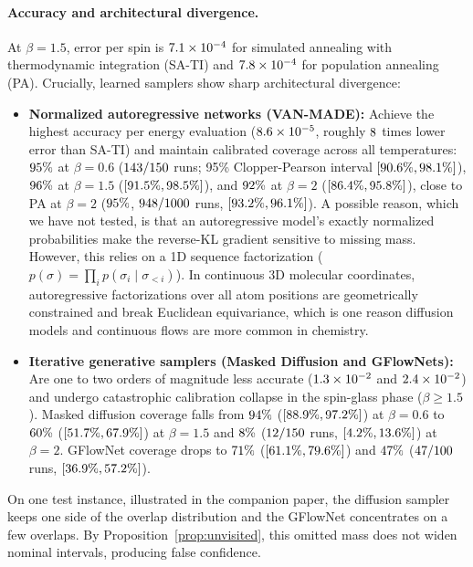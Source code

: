 \paragraph{Accuracy and architectural divergence.} At $\beta=1.5$, error per spin is $7.1\times10^{-4}$ for simulated annealing with thermodynamic integration (SA-TI) and $7.8\times10^{-4}$ for population annealing (PA). Crucially, learned samplers show sharp architectural divergence:
\begin{itemize}
\item \textbf{Normalized autoregressive networks (VAN-MADE):} Achieve the highest accuracy per energy evaluation ($8.6\times10^{-5}$, roughly $8$ times lower error than SA-TI) and maintain calibrated coverage across all temperatures: $95\%$ at $\beta=0.6$ ($143/150$ runs; 95\% Clopper-Pearson interval $[90.6\%, 98.1\%]$), $96\%$ at $\beta=1.5$ ($[91.5\%, 98.5\%]$), and $92\%$ at $\beta=2$ ($[86.4\%, 95.8\%]$), close to PA at $\beta=2$ ($95\%$, $948/1000$ runs, $[93.2\%, 96.1\%]$). A possible reason, which we have not tested, is that an autoregressive model's exactly normalized probabilities make the reverse-KL gradient sensitive to missing mass. However, this relies on a 1D sequence factorization ($p(\sigma)=\prod_i p(\sigma_i\mid\sigma_{<i})$). In continuous 3D molecular coordinates, autoregressive factorizations over all atom positions are geometrically constrained and break Euclidean equivariance, which is one reason diffusion models and continuous flows are more common in chemistry.
\item \textbf{Iterative generative samplers (Masked Diffusion and GFlowNets):} Are one to two orders of magnitude less accurate ($1.3\times10^{-2}$ and $2.4\times10^{-2}$) and undergo catastrophic calibration collapse in the spin-glass phase ($\beta \ge 1.5$). Masked diffusion coverage falls from $94\%$ ($[88.9\%, 97.2\%]$) at $\beta=0.6$ to $60\%$ ($[51.7\%, 67.9\%]$) at $\beta=1.5$ and $8\%$ ($12/150$ runs, $[4.2\%, 13.6\%]$) at $\beta=2$. GFlowNet coverage drops to $71\%$ ($[61.1\%, 79.6\%]$) and $47\%$ ($47/100$ runs, $[36.9\%, 57.2\%]$).
\end{itemize}
On one test instance, illustrated in the companion paper, the diffusion sampler keeps one side of the overlap distribution and the GFlowNet concentrates on a few overlaps. By Proposition~\ref{prop:unvisited}, this omitted mass does not widen nominal intervals, producing false confidence.

